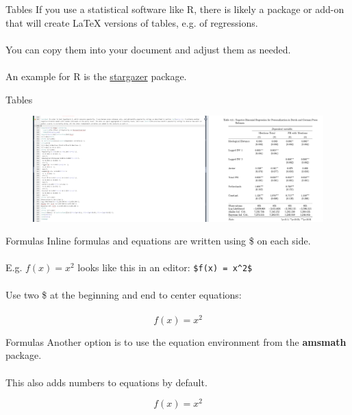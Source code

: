 \documentclass{beamer}
\begin{document}
\begin{frame}{Tables}
If you use a statistical software like R, there is likely a package or add-on that will create LaTeX versions of tables, e.g. of regressions.\\~\\
You can copy them into your document and adjust them as needed.\\~\\
An example for R is the \href{https://cran.r-project.org/web/packages/stargazer/stargazer.pdf}{stargazer} package.
\end{frame}

\begin{frame}{Tables}
\begin{figure}
    \centering
    \includegraphics[width=\textwidth]{stargazer.png}
\end{figure}    
\end{frame}

\begin{frame}[fragile]{Formulas}
Inline formulas and equations are written using \$ on each side.\\~\\
E.g. $f(x) = x^2$ looks like this in an editor: \verb|$f(x) = x^2$|\\~\\
\pause
Use two \$ at the beginning and end to center equations:\\~\\
$$f(x) = x^2$$
\end{frame}

\begin{frame}{Formulas}
Another option is to use the equation environment from the \textbf{amsmath} package.\\~\\
This also adds numbers to equations by default.

\begin{equation}
    f(x) = x^2
\end{equation}  

\end{frame}
\end{document}
